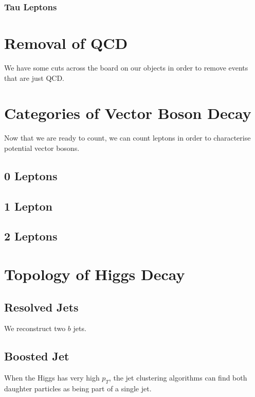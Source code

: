 \subsubsection{Tau Leptons}

\section{Removal of QCD}

We have some cuts across the board on our objects
in order to remove events that are just QCD.

\section{Categories of Vector Boson Decay}

Now that we are ready to count,
we can count leptons in order to characterise
potential vector bosons.

\subsection{0 Leptons}

\subsection{1 Lepton}

\subsection{2 Leptons}

\section{Topology of Higgs Decay}

\subsection{Resolved Jets}

We reconstruct two $b$ jets.

\subsection{Boosted Jet}

When the Higgs has very high $p_T$,
the jet clustering algorithms can find both daughter particles
as being part of a single jet.

